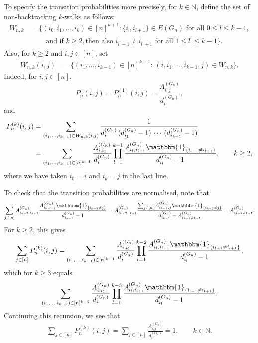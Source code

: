 \documentclass[11pt]{article}
\numberwithin{equation}{section}
\theoremstyle{plain}
\newcommand{\N}{\mathbb N}
\newcommand{\dn}{d^{(G_{n})}}
\begin{document}
To specify the transition probabilities more precisely, for $k\in \N$, define the set of non-backtracking $k$-walks as follows:
\begin{align*}
W_{n,k} &= \Big\{(i_0 ,i_1 ,\ldots ,i_k)\in[n]^{k+1}:\{i_l,i_{l+1}\}\in E(G_n)\text{ for all }0\leq l\leq k-1,\\
&\qquad \text{ and if } k\geq 2, \text{then also } i_{l^\prime -1}\neq i_{l^\prime +1} \text{ for all }
1\leq l^{\prime}\leq k-1\Big\}.
\end{align*}
Also, for $k\geq 2$ and $i,j\in [n]$, set
\begin{align*}
W_{n,k}(i,j) &= \Big\{(i_1 ,\ldots ,i_{k-1})\in[n]^{k-1}\colon\,(i ,i_1 ,\ldots ,i_{k-1},j) \in W_{n,k}\Big\}.
\end{align*}
Indeed, for $i,j\in [n]$,
\begin{equation}
\label{transitions1}
P_{n}(i,j) = P_{n}^{(1)}(i,j) = \frac{A_{i,j}^{(G_{n})}}{d_{i}^{(G_{n})}},
\end{equation}
and
\begin{equation}
\label{transitions2}
\begin{aligned} 
P_{n}^{(k)}(i,j) &= \sum_{(i_1 ,\ldots ,i_{k-1})\in W_{n,k}(i,j)}\dfrac{1}{\dn_{i}\,(\dn_{i_{1}}-1)\,\cdots\, (\dn_{i_{k-1}}-1)}\\
&= \sum_{(i_1 ,\ldots ,i_{k-1})\in [n]^{k-1}}\frac{A^{(G_{n})}_{i,i_{1}}}{\dn_{i}}\prod_{l=1}^{k-1}
\frac{A^{(G_{n})}_{i_{l},i_{l+1}}\mathbbm{1}_{\{i_{l-1}\neq i_{l+1}\}}}{d^{(G_{n})}_{i_{l}}-1}, \qquad k\geq 2,
\end{aligned}
\end{equation}
where we have taken $i_{0}=i$ and $i_{k}=j$ in the last line. 

To check that the transition probabilities are normalised, note that
\begin{align*}
\sum_{j \in [n]} A^{(G_{n})}_{i_{k-2},i_{k-1}}\frac{A^{(G_{n})}_{i_{k-1},j}
\mathbbm{1}_{\{i_{k-2}\neq j\}}}{d^{(G_{n})}_{i_{k-1}}-1}=A^{(G_{n})}_{i_{k-2},i_{k-1}}
\frac{\sum_{j \in [n]}A^{(G_{n})}_{i_{k-1},j}
\mathbbm{1}_{\{i_{k-2}\neq j\}}}{d^{(G_{n})}_{i_{k-1}}-A^{(G_{n})}_{i_{k-2},i_{k-1}}}
= A^{(G_{n})}_{i_{k-2},i_{k-1}}.
\end{align*}
For $k \geq 2$, this gives
\begin{align*}
\sum_{j \in [n]}P_{n}^{(k)}(i,j) = \sum_{(i_1 ,\ldots ,i_{k-1})\in [n]^{k-1}}\frac{A^{(G_{n})}_{i,i_{1}}}{\dn_{i}}
\prod_{l=1}^{k-2}\frac{A^{(G_{n})}_{i_{l},i_{l+1}}\mathbbm{1}_{\{i_{l-1}\neq i_{l+1}\}}}{d^{(G_{n})}_{i_{l}}-1},
\end{align*}
which for $k \geq 3$ equals
\begin{align*}
\sum_{(i_1 ,\ldots ,i_{k-2})\in [n]^{k-2}}\frac{A^{(G_{n})}_{i,i_{1}}}{\dn_{i}}
\prod_{l=1}^{k-3}\frac{A^{(G_{n})}_{i_{l},i_{l+1}}\mathbbm{1}_{\{i_{l-1}\neq i_{l+1}\}}}{d^{(G_{n})}_{i_{l}}-1}.
\end{align*}
Continuing this recursion, we see that
\begin{align*}
\sum_{j \in [n]} P_{n}^{(k)}(i,j) = \sum_{j \in [n]}\frac{A_{i,j}^{(G_{n})}}{d_{i}^{(G_{n})}} = 1,
\qquad k \in \N.
\end{align*}
\end{document}
